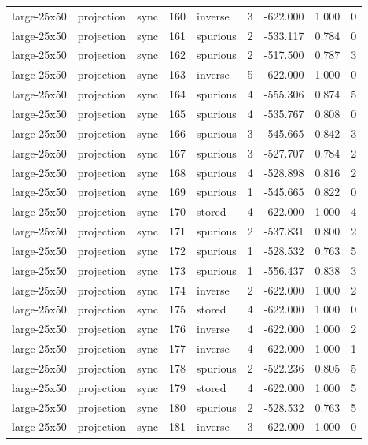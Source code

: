 \begin{tabular}{lllrlrrrr}
large-25x50 & projection & sync & 160 & inverse & 3 & -622.000 & 1.000 & 0 \\
large-25x50 & projection & sync & 161 & spurious & 2 & -533.117 & 0.784 & 0 \\
large-25x50 & projection & sync & 162 & spurious & 2 & -517.500 & 0.787 & 3 \\
large-25x50 & projection & sync & 163 & inverse & 5 & -622.000 & 1.000 & 0 \\
large-25x50 & projection & sync & 164 & spurious & 4 & -555.306 & 0.874 & 5 \\
large-25x50 & projection & sync & 165 & spurious & 4 & -535.767 & 0.808 & 0 \\
large-25x50 & projection & sync & 166 & spurious & 3 & -545.665 & 0.842 & 3 \\
large-25x50 & projection & sync & 167 & spurious & 3 & -527.707 & 0.784 & 2 \\
large-25x50 & projection & sync & 168 & spurious & 4 & -528.898 & 0.816 & 2 \\
large-25x50 & projection & sync & 169 & spurious & 1 & -545.665 & 0.822 & 0 \\
large-25x50 & projection & sync & 170 & stored & 4 & -622.000 & 1.000 & 4 \\
large-25x50 & projection & sync & 171 & spurious & 2 & -537.831 & 0.800 & 2 \\
large-25x50 & projection & sync & 172 & spurious & 1 & -528.532 & 0.763 & 5 \\
large-25x50 & projection & sync & 173 & spurious & 1 & -556.437 & 0.838 & 3 \\
large-25x50 & projection & sync & 174 & inverse & 2 & -622.000 & 1.000 & 2 \\
large-25x50 & projection & sync & 175 & stored & 4 & -622.000 & 1.000 & 0 \\
large-25x50 & projection & sync & 176 & inverse & 4 & -622.000 & 1.000 & 2 \\
large-25x50 & projection & sync & 177 & inverse & 4 & -622.000 & 1.000 & 1 \\
large-25x50 & projection & sync & 178 & spurious & 2 & -522.236 & 0.805 & 5 \\
large-25x50 & projection & sync & 179 & stored & 4 & -622.000 & 1.000 & 5 \\
large-25x50 & projection & sync & 180 & spurious & 2 & -528.532 & 0.763 & 5 \\
large-25x50 & projection & sync & 181 & inverse & 3 & -622.000 & 1.000 & 0 \\

\end{tabular}
